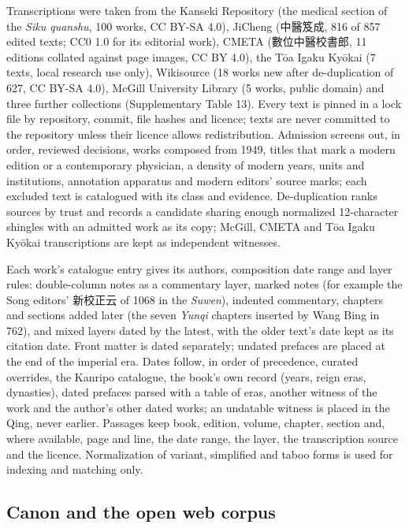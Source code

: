 \documentclass[
]{article}
\begin{document}
Transcriptions were taken from the Kanseki Repository (the medical
section of the \emph{Siku quanshu}, 100 works, CC BY-SA 4.0), JiCheng
(中醫笈成, 816 of 857 edited texts; CC0 1.0 for its editorial work),
CMETA (數位中醫校書郎, 11 editions collated against page images, CC BY
4.0), the Tōa Igaku Kyōkai (7 texts, local research use only),
Wikisource (18 works new after de-duplication of 627, CC BY-SA 4.0),
McGill University Library (5 works, public domain) and three further
collections (Supplementary Table 13). Every text is pinned in a lock
file by repository, commit, file hashes and licence; texts are never
committed to the repository unless their licence allows redistribution.
Admission screens out, in order, reviewed decisions, works composed from
1949, titles that mark a modern edition or a contemporary physician, a
density of modern years, units and institutions, annotation apparatus
and modern editors' source marks; each excluded text is catalogued with
its class and evidence. De-duplication ranks sources by trust and
records a candidate sharing enough normalized 12-character shingles with
an admitted work as its copy; McGill, CMETA and Tōa Igaku Kyōkai
transcriptions are kept as independent witnesses.

Each work's catalogue entry gives its authors, composition date range
and layer rules: double-column notes as a commentary layer, marked notes
(for example the Song editors' 新校正云 of 1068 in the \emph{Suwen}),
indented commentary, chapters and sections added later (the seven
\emph{Yunqi} chapters inserted by Wang Bing in 762), and mixed layers
dated by the latest, with the older text's date kept as its citation
date. Front matter is dated separately; undated prefaces are placed at
the end of the imperial era. Dates follow, in order of precedence,
curated overrides, the Kanripo catalogue, the book's own record (years,
reign eras, dynasties), dated prefaces parsed with a table of eras,
another witness of the work and the author's other dated works; an
undatable witness is placed in the Qing, never earlier. Passages keep
book, edition, volume, chapter, section and, where available, page and
line, the date range, the layer, the transcription source and the
licence. Normalization of variant, simplified and taboo forms is used
for indexing and matching only.

\hypertarget{canon-and-the-open-web-corpus}{%
\subsection{Canon and the open web
corpus}\label{canon-and-the-open-web-corpus}}
\end{document}
